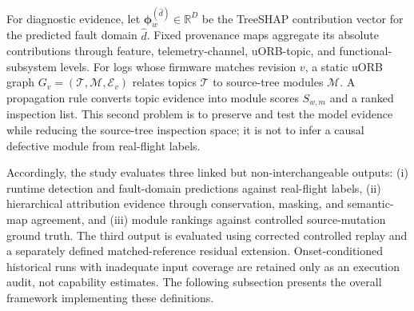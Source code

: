 For diagnostic evidence, let $\boldsymbol{\phi}_w^{(\hat d)}\in\mathbb{R}^{D}$ be the TreeSHAP contribution vector for the predicted fault domain $\hat d$. Fixed provenance maps aggregate its absolute contributions through feature, telemetry-channel, uORB-topic, and functional-subsystem levels. For logs whose firmware matches revision $v$, a static uORB graph $G_v=(\mathcal{T},\mathcal{M},\mathcal{E}_v)$ relates topics $\mathcal{T}$ to source-tree modules $\mathcal{M}$. A propagation rule converts topic evidence into module scores $S_{w,m}$ and a ranked inspection list. This second problem is to preserve and test the model evidence while reducing the source-tree inspection space; it is not to infer a causal defective module from real-flight labels.

Accordingly, the study evaluates three linked but non-interchangeable outputs: (i) runtime detection and fault-domain predictions against real-flight labels, (ii) hierarchical attribution evidence through conservation, masking, and semantic-map agreement, and (iii) module rankings against controlled source-mutation ground truth. The third output is evaluated using corrected controlled replay and a separately defined matched-reference residual extension. Onset-conditioned historical runs with inadequate input coverage are retained only as an execution audit, not capability estimates. The following subsection presents the overall framework implementing these definitions.
